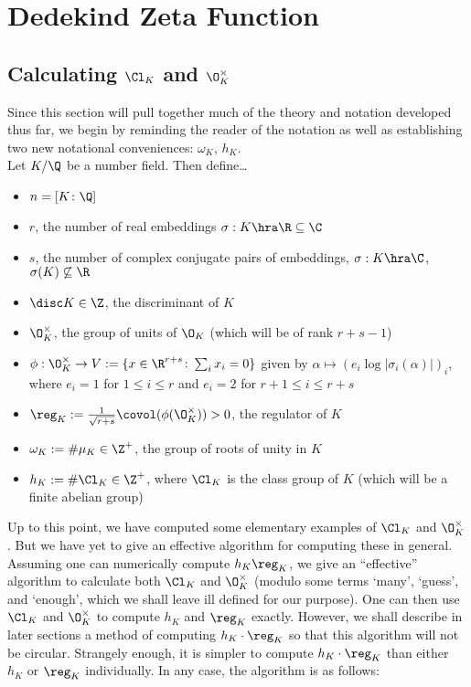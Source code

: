 
\section{Dedekind Zeta Function}
\subsection{Calculating $\Cl_K$ and $\O_K^\times$ \label{sec:count}}

Since this section will pull together much of the theory and notation developed thus far, we begin by reminding the reader of the notation as well as establishing two new notational conveniences: $\omega_K$, $h_K$. \\

Let $K/\Q$ be a number field. Then define\dots

\begin{itemize}
\item $n=[K \colon \Q]$
\item $r$, the number of real embeddings $\sigma: K \hra \R \subseteq \C$
\item $s$,  the number of complex conjugate pairs of embeddings, $\sigma: K \hra \C$, $\sigma(K) \not\subseteq \R$
\item $\disc K \in \Z$, the discriminant of $K$
\item $\O_K^\times$, the group of units of $\O_K$ (which will be of rank $r+s-1$)
\item $\phi: \O_K^\times \to V:=\{x \in \R^{r+s} \colon \sum_i x_i=0\}$ given by $\alpha \mapsto (e_i\log|\sigma_i(\alpha)|)_i$, where $e_i=1$ for $1 \leq i \leq r$ and $e_i=2$ for $r+1 \leq i \leq r+s$
\item $\reg_K:=\frac{1}{\sqrt{r+s}} \covol(\phi(\O_K^\times))>0$, the regulator of $K$
\item $\omega_K:= \#\mu_K \in \Z^+$, the group of roots of unity in $K$
\item $h_K:=\#\Cl_K \in \Z^+$, where $\Cl_K$ is the class group of $K$ (which will be a finite abelian group)
\end{itemize}

Up to this point, we have computed some elementary examples of $\Cl_K$ and $\O_K^\times$. But we have yet to give an effective algorithm for computing these in general. Assuming one can numerically compute $h_K \reg_K$, we give an ``effective'' algorithm to calculate both $\Cl_K$ and $\O_K^\times$ (modulo some terms `many', `guess', and `enough', which we shall leave ill defined for our purpose). One can then use $\Cl_K$ and $\O_K^\times$ to compute $h_K$ and $\reg_K$ exactly. However, we shall describe in later sections a method of computing $h_K \cdot \reg_K$ so that this algorithm will not be circular. Strangely enough, it is simpler to compute $h_K \cdot \reg_K$ than either $h_K$ or $\reg_K$ individually. In any case, the algorithm is as follows:

